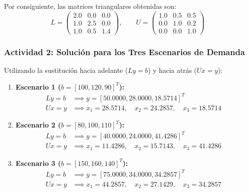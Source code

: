\documentclass[11pt,a4paper]{article}
\theoremstyle{definition}
\theoremstyle{remark}
\begin{document}
Por consiguiente, las matrices triangulares obtenidas son:
\begin{equation}
    L = \begin{pmatrix}
        2.0 & 0.0 & 0.0 \\
        1.0 & 2.5 & 0.0 \\
        1.0 & 0.5 & 1.4
    \end{pmatrix}, \qquad
    U = \begin{pmatrix}
        1.0 & 0.5 & 0.5 \\
        0.0 & 1.0 & 0.2 \\
        0.0 & 0.0 & 1.0
    \end{pmatrix}
\end{equation}

\subsubsection{Actividad 2: Solución para los Tres Escenarios de Demanda}
Utilizando la sustitución hacia adelante ($Ly = b$) y hacia atrás ($Ux = y$):
\begin{enumerate}[leftmargin=*]
    \item \textbf{Escenario 1 ($b = [100, 120, 90]^T$):}
    \begin{align*}
        Ly = b &\implies y = [50.0000, 28.0000, 18.5714]^T \\
        Ux = y &\implies x_1 = 28.5714, \quad x_2 = 24.2857, \quad x_3 = 18.5714
    \end{align*}
    \item \textbf{Escenario 2 ($b = [80, 100, 110]^T$):}
    \begin{align*}
        Ly = b &\implies y = [40.0000, 24.0000, 41.4286]^T \\
        Ux = y &\implies x_1 = 11.4286, \quad x_2 = 15.7143, \quad x_3 = 41.4286
    \end{align*}
    \item \textbf{Escenario 3 ($b = [150, 160, 140]^T$):}
    \begin{align*}
        Ly = b &\implies y = [75.0000, 34.0000, 34.2857]^T \\
        Ux = y &\implies x_1 = 44.2857, \quad x_2 = 27.1429, \quad x_3 = 34.2857
    \end{align*}
\end{enumerate}
\end{document}
